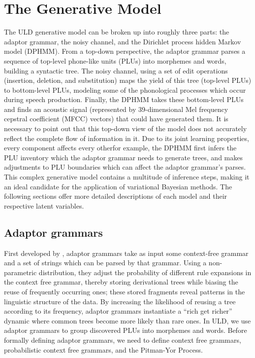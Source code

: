 \documentclass[12pt,letterpaper]{article}
\begin{document}
\section{The Generative Model}
The ULD generative model can be broken up into roughly three parts: the adaptor grammar, the noisy channel, and the Dirichlet process hidden Markov model (DPHMM). From a top-down perspective, the adaptor grammar parses a sequence of top-level phone-like units (PLUs) into morphemes and words, building a syntactic tree. The noisy channel, using a set of edit operations (insertion, deletion, and substitution) maps the yield of this tree (top-level PLUs) to bottom-level PLUs, modeling some of the phonological processes which occur during speech production. Finally, the DPHMM takes these bottom-level PLUs and finds an acoustic signal (represented by 39-dimensional Mel frequency cepstral coefficient (MFCC) vectors) that could have generated them. It is necessary to point out that this top-down view of the model does not accurately reflect the complete flow of information in it. Due to its joint learning properties, every component affects every other\textemdash for example, the DPHMM first infers the PLU inventory which the adaptor grammar needs to generate trees, and makes adjustments to PLU boundaries which can affect the adaptor grammar's parses. This complex generative model contains a multitude of inference steps, making it an ideal candidate for the application of variational Bayesian methods. The following sections offer more detailed descriptions of each model and their respective latent variables. 

\subsection{Adaptor grammars}
First developed by \citet{johnson:2007}, adaptor grammars take as input some context-free grammar and a set of strings which can be parsed by that grammar. Using a non-parametric distribution, they adjust the probability of different rule expansions in the context free grammar, thereby storing derivational trees while biasing the reuse of frequently occurring ones; these stored fragments reveal patterns in the linguistic structure of the data. By increasing the likelihood of reusing a tree according to its frequency, adaptor grammars instantiate a ``rich get richer'' dynamic where common trees become more likely than rare ones. In ULD, we use adaptor grammars to group discovered PLUs into morphemes and words. Before formally defining adaptor grammars, we need to define context free grammars, probabilistic context free grammars, and the Pitman-Yor Process.
\end{document}
